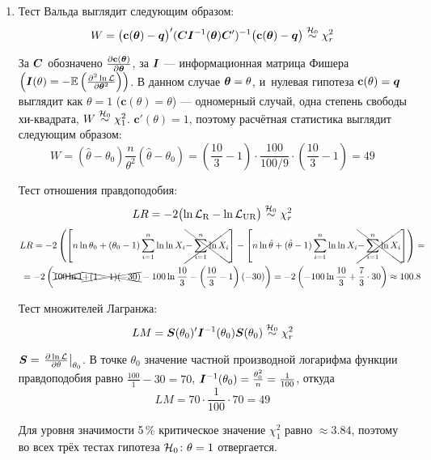 \begin{problem}
\begin{sol}
\begin{enumerate}
\item Тест Вальда  выглядит следующим образом:
\[
W = \bigl(\mathbf{c}(\boldsymbol{\theta}) - \boldsymbol{q}\bigr)' (\boldsymbol{C} \boldsymbol{I}^{-1}(\boldsymbol{\theta}) \boldsymbol{C}')^{-1} \bigl(\mathbf{c}(\boldsymbol{\theta}) - \boldsymbol{q} \bigr) \mathrel{\stackrel{\mathcal{H}_0}{\sim}} \chi^2_{r}
\]

За $\boldsymbol{C}$ обозначено $\frac{\partial \mathbf{c}(\boldsymbol{\theta})}{\partial \boldsymbol{\theta}}$, за $\boldsymbol{I}$ — информационная матрица Фишера $\left(\boldsymbol{I}(\theta) = -\mathbb{E}\left( \frac{\partial^2 \ln \mathcal{L}}{\partial \boldsymbol{\theta}^2} \right)\right)$.
В данном случае $\boldsymbol{\theta} = \theta$, и~нулевая гипотеза $\mathbf{c}(\theta) = \boldsymbol{q}$ выглядит как $\theta=1$ ($\mathbf{c}(\theta) = \theta$) — одномерный случай, одна степень свободы хи-квадрата,
$W \mathrel{\stackrel{\mathcal{H}_0}{\sim}} \chi^2_1$. $\mathbf{c}'(\theta) = 1$, поэтому расчётная статистика выглядит следующим образом:
\[
W = (\hat\theta - \theta_0) \frac{n}{\theta^2} (\hat\theta - \theta_0) = \left( \frac{10}{3} - 1 \right) \cdot \frac{100}{100/9} \cdot \left( \frac{10}{3} - 1 \right) = 49
\]

Тест отношения правдоподобия:
\[
LR = -2 \bigl( \ln \mathcal{L}_{\text{R}} - \ln \mathcal{L}_{\text{UR}} \bigr) \mathrel{\stackrel{\mathcal{H}_0}{\sim}} \chi^2_r
\]
\begin{multline*}
LR = -2 \left( \left[n \ln \theta_0 + (\theta_0-1) \sum\limits_{i=1}^{n} \ln \ln X_i \xcancel{- \sum\limits_{i=1}^{n} \ln X_i}\right] - \left[n \ln \hat\theta + (\hat\theta-1) \sum\limits_{i=1}^{n} \ln \ln X_i \xcancel{- \sum\limits_{i=1}^{n} \ln X_i}\right] \right) = \\
= -2 \left( \xcancel{100 \ln 1} \xcancel{+ (1-1) (-30)}  - 100 \ln \frac{10}{3} - \left(\frac{10}{3}-1 \right) (-30)  \right) = -2 \left( - 100 \ln \frac{10}{3} + \frac73 \cdot 30  \right) \approx 100.8
\end{multline*}

Тест множителей Лагранжа:
\[
LM = \boldsymbol{S}({\theta}_0)' \boldsymbol{I}^{-1}({\theta}_{0}) \boldsymbol{S}({\theta}_{0}) \mathrel{\stackrel{\mathcal{H}_0}{\sim}} \chi^2_r
\]

$\boldsymbol{S} = \left.\frac{\partial \ln \mathcal{L}}{\partial \theta}\right|_{\theta_0}$. В точке $\theta_0$ значение частной производной логарифма функции правдоподобия равно $\frac{100}{1} -30=70$, $\boldsymbol{I}^{-1}(\theta_0) = \frac{\theta^2_0}{n} = \frac{1}{100}$, откуда
\[
LM = 70\cdot \frac{1}{100} \cdot 70 = 49
\]

Для уровня значимости 5\,\% критическое значение $\chi^2_1$ равно $\approx3.84$, поэтому во всех трёх тестах гипотеза $\mathcal{H}_0\colon \theta=1$ отвергается.

\end{enumerate}

\end{sol}
\end{problem}



